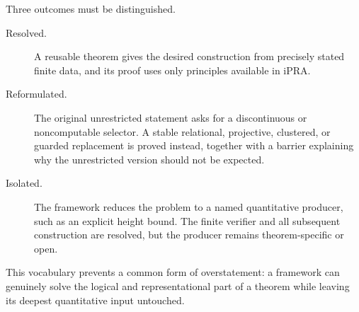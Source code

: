 Three outcomes must be distinguished.

\begin{description}
\item[Resolved.] A reusable theorem gives the desired construction from precisely stated finite data, and its proof uses only principles available in iPRA.
\item[Reformulated.] The original unrestricted statement asks for a discontinuous or noncomputable selector.  A stable relational, projective, clustered, or guarded replacement is proved instead, together with a barrier explaining why the unrestricted version should not be expected.
\item[Isolated.] The framework reduces the problem to a named quantitative producer, such as an explicit height bound.  The finite verifier and all subsequent construction are resolved, but the producer remains theorem-specific or open.
\end{description}

This vocabulary prevents a common form of overstatement: a framework can genuinely solve the logical and representational part of a theorem while leaving its deepest quantitative input untouched.
